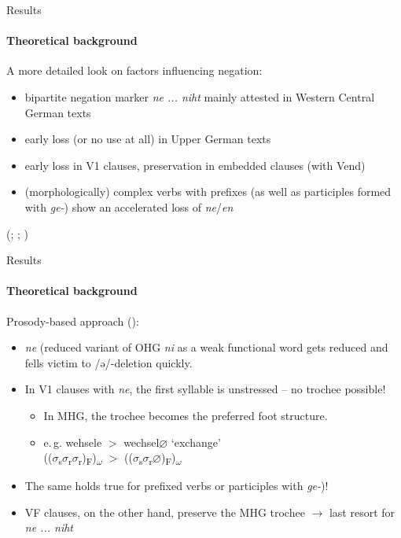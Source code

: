 \documentclass[xcolor=table, compress, %
handout
]{beamer}
\begin{document}
\begin{frame}{Results}
\framesubtitle{Theoretical background}

A more detailed look on factors influencing negation:

\begin{itemize}
    \item bipartite negation marker \textit{ne ... niht} mainly attested in Western Central German texts 
    \item early loss (or no use at all) in Upper German texts
    \item early loss in V1 clauses, preservation in embedded clauses (with Vend)
    \item (morphologically) complex verbs with prefixes (as well as participles formed with \textit{ge-}) show an accelerated loss of \textit{ne}/\textit{en}
\end{itemize}

{\tiny (\citealt{behaghel18,Gaertner1977,Pickl2017}; \citealt{schueler16,schueler17}; \citealt{hrbek21})}

\end{frame}


\begin{frame}{Results}
\framesubtitle{Theoretical background}

Prosody-based approach (\citealt{HertelimErscheinen}):

\begin{itemize}
    \item \textit{ne} (reduced variant of OHG \textit{ni} as a weak functional word gets reduced and fells victim to /ə/-deletion quickly.
    \item In V1 clauses with \textit{ne}, the first syllable is unstressed – no trochee possible!
    \begin{itemize}
    \item In MHG, the trochee becomes the preferred foot structure.
    \item e.\,g. wehsele $>$  wechsel\alert{$\varnothing$} ‘exchange’\\
(($\sigma$\textsubscript{s}$\sigma$\textsubscript{r}\alert{$\sigma$\textsubscript{r}})\textsubscript{F})\textsubscript{$\omega$} $>$   (($\sigma$\textsubscript{s}$\sigma$\textsubscript{r}\alert{$\varnothing$})\textsubscript{F})\textsubscript{$\omega$}
    \end{itemize}
    \item The same holds true for prefixed verbs or participles with \textit{ge-})!
    \item VF clauses, on the other hand, preserve the MHG trochee $\rightarrow$ last resort for \textit{ne ... niht}
\end{itemize}

\end{frame}
\end{document}
